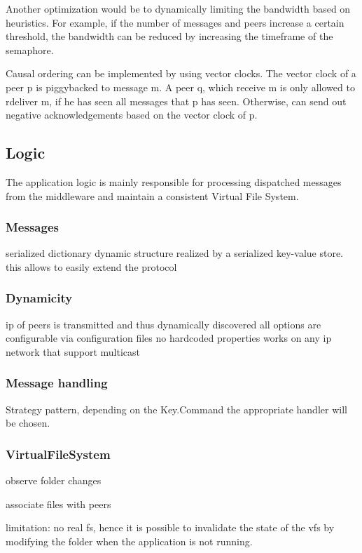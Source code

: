 Another optimization would be to dynamically limiting the bandwidth based on heuristics. For example, if the number of messages and peers increase a certain threshold, the bandwidth can be reduced by increasing the timeframe of the semaphore. 

Causal ordering can be implemented by using vector clocks. The vector clock of a peer p is piggybacked to message m. A peer q, which receive m is only allowed to rdeliver m, if he has seen all messages that p has seen. Otherwise, can send out negative acknowledgements based on the vector clock of p. 

\subsection{Logic}

The application logic is mainly responsible for processing dispatched messages from the middleware and maintain a consistent Virtual File System.
    
    \subsubsection{Messages}
    serialized dictionary
    dynamic structure realized by a serialized key-value store. 
    this allows to easily extend the protocol

    \subsubsection{Dynamicity}
    ip of peers is transmitted and thus dynamically discovered
    all options are configurable via configuration files
    no hardcoded properties
    works on any ip network that support multicast
    
    
    \subsubsection{Message handling}
    Strategy pattern, depending on the Key.Command the appropriate handler will be chosen.
    
    \subsubsection{VirtualFileSystem}
    
    observe folder changes
    
    associate files with peers
    
    limitation: no real fs, hence it is possible to invalidate the state of the vfs by modifying the folder when the application is not running. 
    
